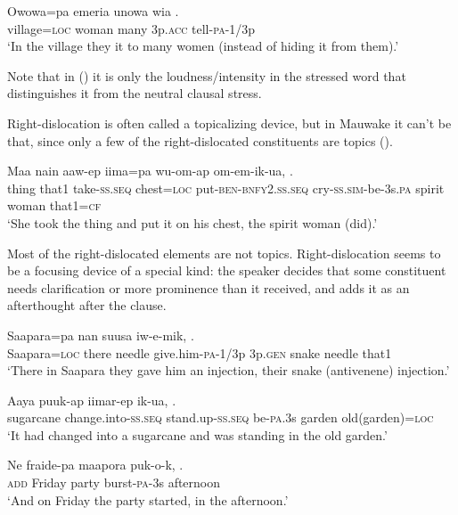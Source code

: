 \ea%
\label{ex:x1742}
\gll Owowa=pa  emeria  unowa  wia  \textstyleEmphasizedVernacularWords{{{\textprimstress}}}. \\
village=\textsc{loc}  woman  many  3p.\textsc{acc}  tell-\textsc{pa}-1/3p      \\
\glt`In the village they  it to many women (instead of hiding it from them).'
\z


Note that in () it is only the loudness/intensity in the stressed word that distinguishes it from the neutral clausal stress.

Right-dislocation is often called a topicalizing device, but in Mauwake it can't be that, since only a few of the right-dislocated constituents are topics (). 

\ea%
\label{ex:x1745}
\gll Maa  nain  aaw-ep  iima=pa  wu-om-ap om-em-ik-ua,      .\\
thing  that1  take-\textsc{ss}.\textsc{seq}  chest=\textsc{loc} put-\textsc{ben}-\textsc{bnfy}2.\textsc{ss}.\textsc{seq} cry-\textsc{ss}.\textsc{sim}-be-3s.\textsc{pa}  spirit  woman  that1=\textsc{cf}\\
\glt`She took the thing and put it on his chest, the spirit woman (did).'
\z


Most of the right-dislocated elements are not topics. Right-dislocation seems to be a focusing device of a special kind: the speaker decides that some constituent needs clarification or more prominence than it received, and adds it as an afterthought after the clause.

\ea%
\label{ex:x1746}
\gll Saapara=pa  nan  suusa  iw-e-mik,     .\\
Saapara=\textsc{loc}  there  needle  give.him-\textsc{pa}-1/3p  3p.\textsc{gen}  snake needle  that1\\
\glt`There in Saapara they gave him an injection, their snake (antivenene) injection.'
\z


\ea%
\label{ex:x1747}
\gll Aaya puuk-ap iimar-ep ik-ua,   .\\
sugarcane  change.into-\textsc{ss}.\textsc{seq}  stand.up-\textsc{ss}.\textsc{seq} be-\textsc{pa}.3s garden  old(garden)=\textsc{loc}\\
\glt`It had changed into a sugarcane and was standing in the old garden.'
\z


\ea%
\label{ex:x1748}
\gll Ne  fraide-pa  maapora  puk-o-k,  .\\
\textsc{add}  Friday  party  burst-\textsc{pa}-3s  afternoon\\
\glt`And on Friday the party started, in the afternoon.'
\z
{}
